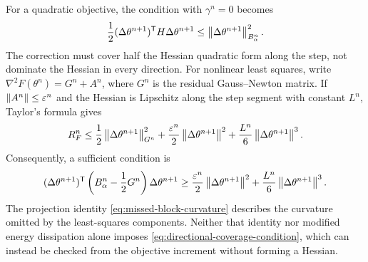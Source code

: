 For a quadratic objective, the condition with \(\gamma^n=0\) becomes
\[
  \frac12(\Delta\theta^{n+1})^{\mathsf T}H\Delta\theta^{n+1}
  \leq\left\lVert\Delta\theta^{n+1}\right\rVert_{B_\alpha^n}^2.
\]
The correction must cover half the Hessian quadratic form along the step, not
dominate the Hessian in every direction. For nonlinear least squares, write
\(\nabla^2F(\theta^n)=G^n+A^n\), where \(G^n\) is the residual
Gauss--Newton matrix. If \(\left\lVert A^n\right\rVert\leq\varepsilon^n\) and the Hessian
is Lipschitz along the step segment with constant \(L^n\), Taylor's formula
gives
\[
  R_F^n\leq\frac12\left\lVert\Delta\theta^{n+1}\right\rVert_{G^n}^2
  +\frac{\varepsilon^n}{2}\left\lVert\Delta\theta^{n+1}\right\rVert^2
  +\frac{L^n}{6}\left\lVert\Delta\theta^{n+1}\right\rVert^3.
\]
Consequently, a sufficient condition is
\begin{equation}
  (\Delta\theta^{n+1})^{\mathsf T}
  \left(B_\alpha^n-\frac12G^n\right)\Delta\theta^{n+1}
  \geq\frac{\varepsilon^n}{2}\left\lVert\Delta\theta^{n+1}\right\rVert^2
      +\frac{L^n}{6}\left\lVert\Delta\theta^{n+1}\right\rVert^3.
  \label{eq:least-squares-coverage-margin}
\end{equation}
The projection identity \cref{eq:missed-block-curvature} describes the
curvature omitted by the least-squares components. Neither that identity nor
modified energy dissipation alone imposes
\cref{eq:directional-coverage-condition}, which can instead be checked from
the objective increment without forming a Hessian.
